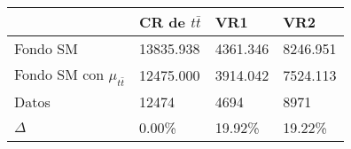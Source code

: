 \begin{tabular}{L{27mm} C{22mm}C{22mm}C{22mm}}
\toprule
                                & CR de $t\bar{t}$  & VR1               & VR2               \\
\midrule
Fondo SM                        & 13835.938         & 4361.346          & 8246.951          \\
Fondo SM con $\mu_{t\bar{t}}$   & 12475.000         & 3914.042          & 7524.113          \\
Datos                           & 12474             & 4694              & 8971              \\
$\Delta$                        & 0.00\%            & 19.92\%           & 19.22\%           \\
\bottomrule
\end{tabular}